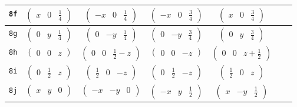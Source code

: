 \documentclass[fleqn,9pt,landscape]{jsarticle}
\begin{document}
\begin{center}
\begin{longtable}{ccccccc}
{\tt 8f} & $ \begin{pmatrix} x & 0 & \frac{1}{4} \end{pmatrix} $ & $ \begin{pmatrix} - x & 0 & \frac{1}{4} \end{pmatrix} $ & $ \begin{pmatrix} - x & 0 & \frac{3}{4} \end{pmatrix} $ & $ \begin{pmatrix} x & 0 & \frac{3}{4} \end{pmatrix} $ & $  $ & $  $ \\ \hline
{\tt 8g} & $ \begin{pmatrix} 0 & y & \frac{1}{4} \end{pmatrix} $ & $ \begin{pmatrix} 0 & - y & \frac{1}{4} \end{pmatrix} $ & $ \begin{pmatrix} 0 & - y & \frac{3}{4} \end{pmatrix} $ & $ \begin{pmatrix} 0 & y & \frac{3}{4} \end{pmatrix} $ & $  $ & $  $ \\ \hline
{\tt 8h} & $ \begin{pmatrix} 0 & 0 & z \end{pmatrix} $ & $ \begin{pmatrix} 0 & 0 & \frac{1}{2} - z \end{pmatrix} $ & $ \begin{pmatrix} 0 & 0 & - z \end{pmatrix} $ & $ \begin{pmatrix} 0 & 0 & z + \frac{1}{2} \end{pmatrix} $ & $  $ & $  $ \\ \hline
{\tt 8i} & $ \begin{pmatrix} 0 & \frac{1}{2} & z \end{pmatrix} $ & $ \begin{pmatrix} \frac{1}{2} & 0 & - z \end{pmatrix} $ & $ \begin{pmatrix} 0 & \frac{1}{2} & - z \end{pmatrix} $ & $ \begin{pmatrix} \frac{1}{2} & 0 & z \end{pmatrix} $ & $  $ & $  $ \\ \hline
{\tt 8j} & $ \begin{pmatrix} x & y & 0 \end{pmatrix} $ & $ \begin{pmatrix} - x & - y & 0 \end{pmatrix} $ & $ \begin{pmatrix} - x & y & \frac{1}{2} \end{pmatrix} $ & $ \begin{pmatrix} x & - y & \frac{1}{2} \end{pmatrix} $ & $  $ & $  $ \\ \hline

\end{longtable}
\end{center}
\end{document}
